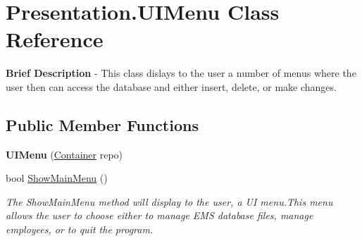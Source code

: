 \hypertarget{class_presentation_1_1_u_i_menu}{}\section{Presentation.\+U\+I\+Menu Class Reference}
\label{class_presentation_1_1_u_i_menu}


{\bfseries Brief Description} -\/ This class dislays to the user a number of menus where the user then can access the database and either insert, delete, or make changes.  


\subsection*{Public Member Functions}
\begin{DoxyCompactItemize}
\item 
\hypertarget{class_presentation_1_1_u_i_menu_ac27724c06cbdcddbcf940f812ba307e3}{}{\bfseries U\+I\+Menu} (\hyperlink{class_the_company_1_1_container}{Container} repo)\label{class_presentation_1_1_u_i_menu_ac27724c06cbdcddbcf940f812ba307e3}

\item 
bool \hyperlink{class_presentation_1_1_u_i_menu_aa358c475a580c724b992458425649ada}{Show\+Main\+Menu} ()
\begin{DoxyCompactList}\small\item\em The Show\+Main\+Menu method will display to the user, a U\+I menu.\+This menu allows the user to choose either to manage E\+M\+S database files, manage employees, or to quit the program. \end{DoxyCompactList}\end{DoxyCompactItemize}
